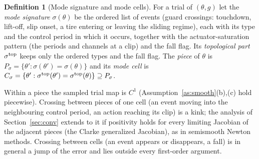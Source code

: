 \documentclass[11pt]{article}
\theoremstyle{definition}
\newtheorem{definition}[theorem]{Definition}
\theoremstyle{remark}
\begin{document}
\begin{definition}[Mode signature and mode cells]\label{def:sigma}
For a trial of $(\theta,g)$ let the \emph{mode signature} $\sigma(\theta)$ be the ordered list of events (guard
crossings: touchdown, lift-off, slip onset, a tire entering or leaving the sliding regime), each with its type and the
control period in which it occurs, together with the actuator-saturation pattern (the periods and channels at a clip)
and the fall flag. Its \emph{topological part} $\sigma^{\rm top}$ keeps only the ordered types and the fall flag.
The \emph{piece} of $\theta$ is $P_\sigma=\{\theta':\sigma(\theta')=\sigma(\theta)\}$ and its \emph{mode cell} is
$C_\sigma=\{\theta':\sigma^{\rm top}(\theta')=\sigma^{\rm top}(\theta)\}\supseteq P_\sigma$.
\end{definition}
Within a piece the sampled trial map is $C^1$ (Assumption~\ref{as:smooth}(b),(c) hold piecewise). Crossing between
pieces of one cell (an event moving into the neighbouring control period, an action reaching its clip) is a kink; the
analysis of Section~\ref{sec:conv} extends to it if positivity holds for every limiting Jacobian of the adjacent pieces
(the Clarke generalized Jacobian), as in semismooth Newton methods. Crossing between cells (an event appears or
disappears, a fall) is in general a jump of the error and lies outside every first-order argument.
\end{document}
